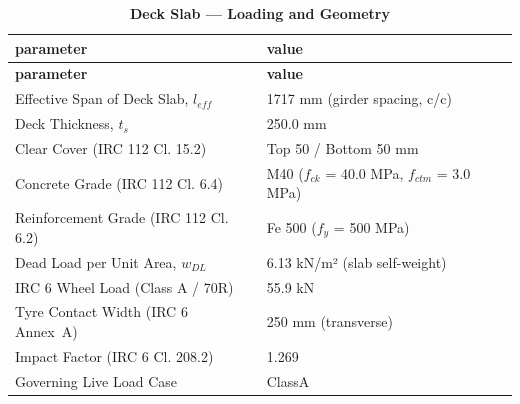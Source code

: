 \documentclass[12pt,a4paper]{report}
\numberwithin{table}{chapter}
\numberwithin{figure}{chapter}
\begin{document}
\vspace{1em}
\begin{longtable}{|L{5.5cm}|p{10.0cm}|}
\caption{\textbf{Deck Slab --- Loading and Geometry}}
\hline
\textbf{parameter} & \textbf{value} \\[6pt]
\hline
\endfirsthead

\hline
\textbf{parameter} & \textbf{value} \\[6pt]
\hline
\endhead
\textnormal{Effective Span of Deck Slab, $l_{eff}$} & 1717 mm (girder spacing, c/c) \\[6pt]
\hline
\textnormal{Deck Thickness, $t_s$} & 250.0 mm \\[6pt]
\hline
\textnormal{Clear Cover (IRC 112 Cl. 15.2)} & Top 50 / Bottom 50 mm \\[6pt]
\hline
\textnormal{Concrete Grade (IRC 112 Cl. 6.4)} & M40 ($f_{ck}$ = 40.0 MPa, $f_{ctm}$ = 3.0 MPa) \\[6pt]
\hline
\textnormal{Reinforcement Grade (IRC 112 Cl. 6.2)} & Fe 500 ($f_y$ = 500 MPa) \\[6pt]
\hline
\textnormal{Dead Load per Unit Area, $w_{DL}$} & 6.13 kN/m² (slab self-weight) \\[6pt]
\hline
\textnormal{IRC 6 Wheel Load (Class A / 70R)} & 55.9 kN \\[6pt]
\hline
\textnormal{Tyre Contact Width (IRC 6 Annex~A)} & 250 mm (transverse) \\[6pt]
\hline
\textnormal{Impact Factor (IRC 6 Cl. 208.2)} & 1.269 \\[6pt]
\hline
\textnormal{Governing Live Load Case} & ClassA \\[6pt]
\hline
\end{longtable}
\end{document}

